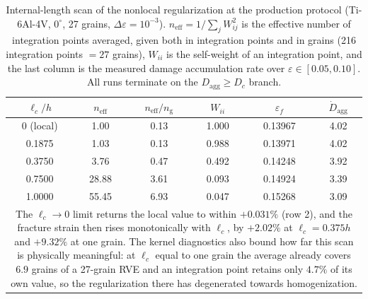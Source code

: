 \documentclass[12pt,a4paper,twocolumn]{article}
\providecommand{\ang}[1]{\ensuremath{#1^{\circ}}}
\begin{document}
\begin{table}[htbp]
\centering
\caption{Internal-length scan of the nonlocal regularization at the production protocol (Ti-6Al-4V, $\ang{0}$,
27 grains, $\Delta\varepsilon = 10^{-3}$). $n_{\mathrm{eff}} = 1/\sum_j W_{ij}^2$ is the effective number of
integration points averaged, given both in integration points and in grains (216 integration points $= 27$
grains), $W_{ii}$ is the self-weight of an integration point, and the last column is the measured damage
accumulation rate over $\varepsilon \in [0.05, 0.10]$. All runs terminate on the $D_{\mathrm{agg}} \ge D_c$
branch.}
\label{tab:nonlocal_lc}
\footnotesize
\setlength{\tabcolsep}{3pt}
\begin{tabular}{cccccc}
\toprule
$\ell_c/h$ & $n_{\mathrm{eff}}$ & $n_{\mathrm{eff}}/n_{\mathrm{g}}$ & $W_{ii}$ & $\varepsilon_f$ & $\dot{D}_{\mathrm{agg}}$ \\
\midrule
0 (local) & 1.00 & 0.13 & 1.000 & 0.13967 & 4.02 \\
0.1875 & 1.03 & 0.13 & 0.988 & 0.13971 & 4.02 \\
0.3750 & 3.76 & 0.47 & 0.492 & 0.14248 & 3.92 \\
0.7500 & 28.88 & 3.61 & 0.093 & 0.14924 & 3.39 \\
1.0000 & 55.45 & 6.93 & 0.047 & 0.15268 & 3.09 \\
\bottomrule
\multicolumn{6}{p{0.97\columnwidth}}{\footnotesize The $\ell_c \to 0$ limit returns the local value to within
$+0.031\%$ (row 2), and the fracture strain then rises monotonically with $\ell_c$, by $+2.02\%$ at
$\ell_c = 0.375h$ and $+9.32\%$ at one grain. The kernel diagnostics also bound how far this scan is
physically meaningful: at $\ell_c$ equal to one grain the average already covers $6.9$ grains of a 27-grain
RVE and an integration point retains only $4.7\%$ of its own value, so the regularization there has
degenerated towards homogenization.}
\end{tabular}
\end{table}
\end{document}
